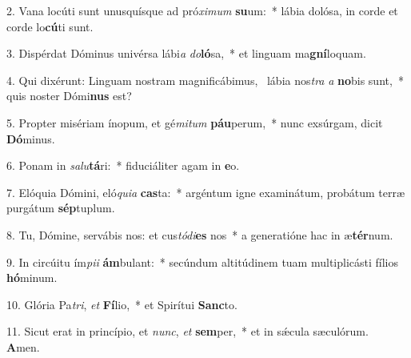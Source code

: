 2. Vana locúti sunt unusquísque ad pró\textit{xi}\textit{mum} \textbf{su}um:~*  lábia dolósa, in corde et corde lo\textbf{cú}ti sunt.\

3. Dispérdat Dóminus univérsa lábi\textit{a} \textit{do}\textbf{ló}sa,~*  et linguam ma\textbf{gní}loquam.\

4. Qui dixérunt: Linguam nostram magnificábimus, \dag\  lábia nos\textit{tra} \textit{a} \textbf{no}bis sunt,~*  quis noster Dómi\textbf{nus} est?\

5. Propter misériam ínopum, et gé\textit{mi}\textit{tum} \textbf{páu}perum,~*  nunc exsúrgam, dicit \textbf{Dó}minus.\

6. Ponam in \textit{sa}\textit{lu}\textbf{tá}ri:~*  fiduciáliter agam in \textbf{e}o.\

7. Elóquia Dómini, eló\textit{qui}\textit{a} \textbf{cas}ta:~*  argéntum igne examinátum, probátum terræ purgátum \textbf{sép}tuplum.\

8. Tu, Dómine, servábis nos: et cus\textit{tó}\textit{di}\textbf{es} nos~*  a generatióne hac in æ\textbf{tér}num.\

9. In circúitu ím\textit{pi}\textit{i} \textbf{ám}bulant:~*  secúndum altitúdinem tuam multiplicásti fílios \textbf{hó}minum.\

10. Glória Pa\textit{tri}, \textit{et} \textbf{Fí}lio,~*  et Spirítui \textbf{Sanc}to.\

11. Sicut erat in princípio, et \textit{nunc}, \textit{et} \textbf{sem}per,~*  et in sǽcula sæculórum. \textbf{A}men.\


